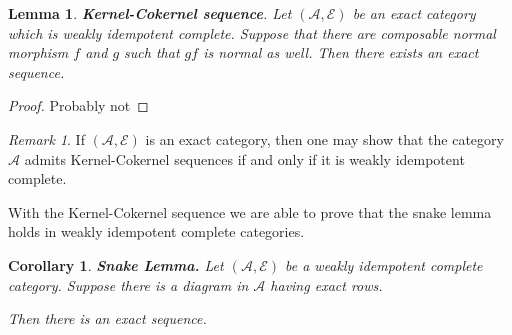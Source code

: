 \documentclass[11pt]{article}
\newtheorem{corollary}{Corollary}[theorem]
\newtheorem{lemma}[theorem]{Lemma}
\theoremstyle{definition}
\theoremstyle{remark}
\newtheorem*{remark}{Remark}
\begin{document}
            \begin{lemma}
                \textbf{Kernel-Cokernel sequence}.
                Let $(\mathcal{A},\mathcal{E})$ be an exact category which is weakly idempotent complete. Suppose that there are composable normal morphism $f$ and $g$ such that $gf$ is normal as well. Then there exists an exact sequence.
                \begin{center}
                \end{center} 
            \end{lemma}

            \begin{proof}
                Probably not
            \end{proof}

            \begin{remark}
                If $(\mathcal{A},\mathcal{E})$ is an exact category, then one may show that the category $\mathcal{A}$ admits Kernel-Cokernel sequences if and only if it is weakly idempotent complete.
            \end{remark}

            With the Kernel-Cokernel sequence we are able to prove that the snake lemma holds in weakly idempotent complete categories.

            \begin{corollary}
                \textbf{Snake Lemma.}
                Let $(\mathcal{A},\mathcal{E})$ be a weakly idempotent complete category. Suppose there is a diagram in $\mathcal{A}$ having exact rows.
                \begin{center}
                \end{center}

                Then there is an exact sequence.
                \begin{center}
                \end{center}
            \end{corollary}
\end{document}
